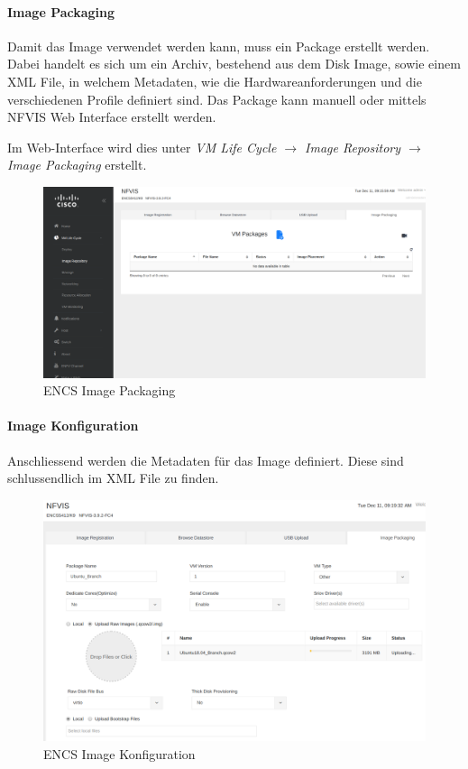 \paragraph{Image Packaging}

Damit das Image verwendet werden kann, muss ein Package erstellt werden. Dabei handelt es sich um ein Archiv, bestehend aus dem Disk Image, sowie einem XML File, in welchem Metadaten, wie die Hardwareanforderungen und die verschiedenen Profile definiert sind.
Das Package kann manuell oder mittels NFVIS Web Interface erstellt werden.

Im Web-Interface wird dies unter \textit{VM Life Cycle $\rightarrow$ Image Repository $\rightarrow$ Image Packaging} erstellt.

\begin{figure}[H]
	\centering
	\includegraphics[width=0.8\linewidth]{img/Absicherung/ENCS-Image-Packaging.png}
	\caption{ENCS Image Packaging}
	\label{fig:ENCS Image Packaging}
\end{figure}

\paragraph{Image Konfiguration}

Anschliessend werden die Metadaten für das Image definiert. Diese sind schlussendlich im XML File zu finden.

\begin{figure}[H]
	\centering
	\includegraphics[width=0.8\linewidth]{img/Absicherung/ENCS-Image-Creation.png}
	\caption{ENCS Image Konfiguration}
	\label{fig:ENCS Image Konfiguration}
\end{figure}


